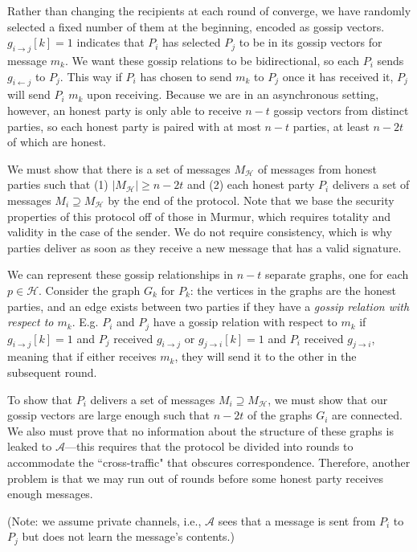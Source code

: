 \documentclass{article}
\begin{document}
Rather than changing the recipients at each round of converge, we have randomly selected a fixed number of them at the beginning, encoded as gossip vectors. $g_{i \rightarrow j}[k] = 1$ indicates that $P_i$ has selected $P_j$ to be in its gossip vectors for message $m_k$. We want these gossip relations to be bidirectional, so each $P_i$ sends $g_{i \leftarrow j}$ to $P_j$. This way if $P_i$ has chosen to send $m_k$ to $P_j$ once it has received it, $P_j$ will send $P_i$ $m_k$ upon receiving. Because we are in an asynchronous setting, however, an honest party is only able to receive $n - t$ gossip vectors from distinct parties, so each honest party is paired with at most $n - t$ parties, at least $n - 2t$ of which are honest. 

We must show that there is a set of messages $M_\mathcal H$ of messages from honest parties such that (1) $|M_\mathcal H| \geq n-2t$ and (2) each honest party $P_i$ delivers a set of messages $M_i \supseteq M_\mathcal H$ by the end of the protocol. Note that we base the security properties of this protocol off of those in Murmur, which requires totality and validity in the case of the sender. We do not require consistency, which is why parties deliver as soon as they receive a new message that has a valid signature.

We can represent these gossip relationships in $n - t$ separate graphs, one for each $p \in \mathcal H$. Consider the graph $G_k$ for $P_k$: the vertices in the graphs are the honest parties, and an edge exists between two parties if they have a \emph{gossip relation with respect to $m_k$}. E.g. $P_i$ and $P_j$ have a gossip relation with respect to $m_k$ if $g_{i \rightarrow j}[k] = 1$ and $P_j$ received $g_{i \rightarrow j}$ or $g_{j \rightarrow i}[k] = 1$ and $P_i$ received $g_{j \rightarrow i}$, meaning that if either receives $m_k$, they will send it to the other in the subsequent round.

To show that $P_i$ delivers a set of messages $M_i \supseteq M_\mathcal H$, we must show that our gossip vectors are large enough such that $n - 2t$ of the graphs $G_i$ are connected. We also must prove that no information about the structure of these graphs is leaked to $\mathcal A$---this requires that the protocol be divided into rounds to accommodate the ``cross-traffic" that obscures correspondence. Therefore, another problem is that we may run out of rounds before some honest party receives enough messages.

(Note: we assume private channels, i.e., $\mathcal{A}$ sees that a message
is sent from $P_i$ to $P_j$ but does not learn the message's contents.)
\end{document}
